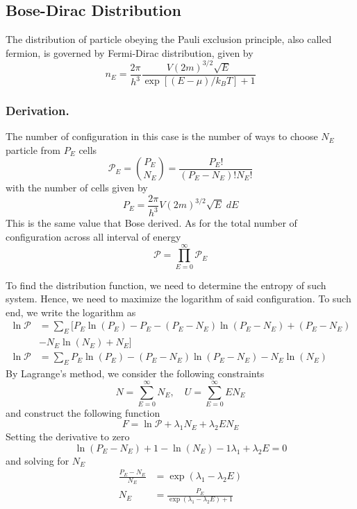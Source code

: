 \documentclass[../../../Main.tex]{subfiles}
\begin{document}
\subsection*{Bose-Dirac Distribution}
The distribution of particle obeying the Pauli exclusion principle, also called fermion, is governed by Fermi-Dirac distribution, given by
\begin{equation*}
    n_E=\frac{2\pi}{h^3} \frac{V (2m)^{3/2}\sqrt{E}}{\exp\left[(E-\mu)/k_BT\right]+1}
\end{equation*}

\subsubsection*{Derivation.} The number of configuration in this case is the number of ways to choose $N_E$ particle from $P_E$ cells
\begin{equation*}
    \mathcal{P}_E={P_E \choose N_E}=\frac{P_E!}{(P_E-N_E)!N_E!}
\end{equation*}
with the number of cells given by
\begin{equation*}
    P_E= \frac{2\pi}{h^3}V(2m)^{3/2}\sqrt{E}\;dE
\end{equation*}
This is the same value that Bose derived. As for the total number of configuration across all interval of energy
\begin{equation*}
    \mathcal{P}=\prod_{E=0}^{\infty}\mathcal{P}_E
\end{equation*}

To find the distribution function, we need to determine the entropy of such system. Hence, we need to maximize the logarithm of said configuration. To such end, we write the logarithm as 
\begin{align*}
    \ln \mathcal{P}&= \sum_E \big[P_E\ln (P_E)- P_E - (P_E-N_E)\ln (P_E-N_E)+ (P_E-N_E) \\
    &- N_E\ln (N_E) + N_E \big]\\
    \ln \mathcal{P}&= \sum_E P_E\ln (P_E) - (P_E-N_E)\ln (P_E-N_E) - N_E\ln (N_E)
\end{align*}
By Lagrange's method, we consider the following constraints
\begin{equation*}
    N=\sum_{E=0}^{\infty}N_E,\quad U=\sum_{E=0}^{\infty}EN_E
\end{equation*}
and construct the following function
\begin{equation*}
    F=\ln \mathcal{P}+\lambda_1 N_E+ \lambda_2 E N_E
\end{equation*}
Setting the derivative to zero
\begin{equation*}
    \ln(P_E- N_E)+1 -\ln(N_E)-1\lambda_1 +\lambda_2E =0
\end{equation*}
and solving for $N_E$
\begin{align*}
    \frac{P_E-N_E}{N_E}&=\exp(\lambda_1 -\lambda_2E)\\
    N_E&=\frac{P_E}{\exp(\lambda_1 -\lambda_2E)+1}
\end{align*}
\end{document}
